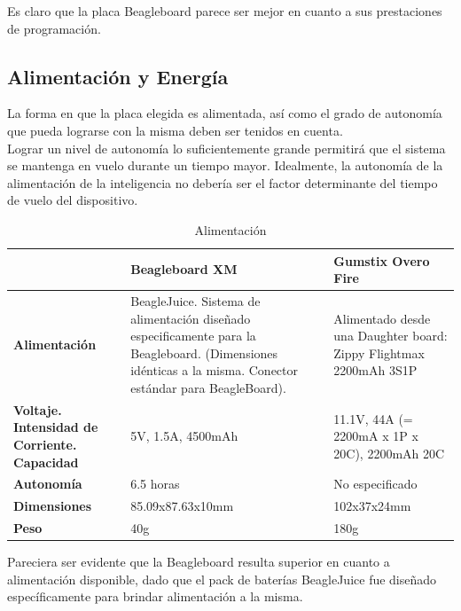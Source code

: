 \documentclass[main]{subfiles}
\begin{document}
Es claro que la placa Beagleboard parece ser mejor en cuanto a sus prestaciones de programaci\'on.

\subsection*{Alimentaci\'on y Energ\'ia}

La forma en que la placa elegida es alimentada, as\'i como el grado de autonom\'ia que pueda lograrse con la misma deben ser tenidos en cuenta.\\
Lograr un nivel de autonom\'ia lo suficientemente grande permitir\'a que el sistema se mantenga en vuelo durante un tiempo mayor. Idealmente, la autonom\'ia de la alimentaci\'on de la inteligencia no deber\'ia ser el factor determinante del tiempo de vuelo del dispositivo.

\begin{table}[H]
\begin{tabular}{p{130pt}|p{130pt}|p{130pt}|} 
\cline{2-3}
& \cellcolor[gray]{0.8} \textbf{Beagleboard XM} 
& \cellcolor[gray]{0.8} \textbf{Gumstix Overo Fire} \\ \cline{1-3} \hline
\multicolumn{1}{|p{130pt}|}{\cellcolor[gray]{0.8}\textbf{Alimentaci\'on}} 
& BeagleJuice. Sistema de alimentaci\'on dise\~nado especificamente para la Beagleboard. (Dimensiones id\'enticas a la misma. Conector est\'andar para BeagleBoard).
& Alimentado desde una Daughter board: Zippy Flightmax 2200mAh 3S1P\\ 
\hline 
\multicolumn{1}{|p{130pt}|}{\cellcolor[gray]{0.8}\textbf{Voltaje. Intensidad de Corriente. Capacidad}} 
&5V, 1.5A, 4500mAh & 11.1V, 44A (= 2200mA x 1P x 20C), 2200mAh 20C\\
\hline
\multicolumn{1}{|p{130pt}|}{\cellcolor[gray]{0.8}\textbf{Autonom\'ia}} 
&6.5 horas &No especificado\\
\hline
\multicolumn{1}{|p{130pt}|}{\cellcolor[gray]{0.8}\textbf{Dimensiones}} 
&85.09x87.63x10mm &102x37x24mm\\
\hline
\multicolumn{1}{|p{130pt}|}{\cellcolor[gray]{0.8}\textbf{Peso}} 
&40g &180g\\
\hline
\end{tabular}
\caption{Alimentaci\'on}
\label{tab:alimentacion}
\end{table}

Pareciera ser evidente que la Beagleboard resulta superior en cuanto a alimentaci\'on disponible, dado que el pack de bater\'ias BeagleJuice fue dise\~nado espec\'ificamente para brindar alimentaci\'on a la misma.
\end{document}
